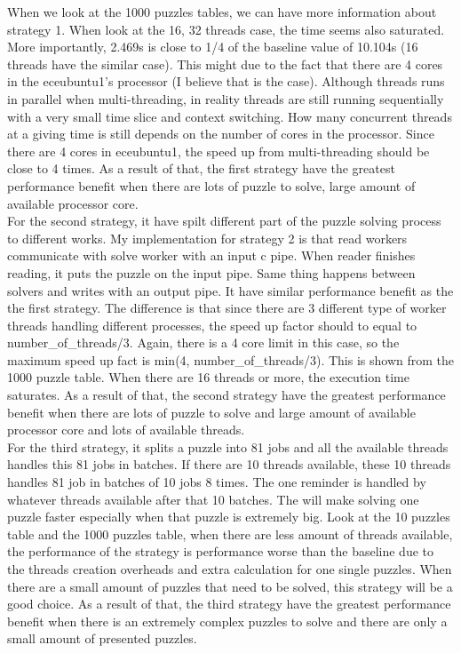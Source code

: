 \documentclass[12pt]{article}
\begin{document}
When we look at the 1000 puzzles tables, we can have more information about strategy 1. When look at the 16, 32 threads case, the time seems also saturated. More importantly, 2.469s is close to 1/4 of the baseline value of 10.104s (16 threads have the similar case). This might due to the fact that there are 4 cores in the eceubuntu1's processor (I believe that is the case). Although threads runs in parallel when multi-threading, in reality threads are still running sequentially with a very small time slice and context switching. How many concurrent threads at a giving time is still depends on the number of cores in the processor. Since there are 4 cores in eceubuntu1, the speed up from multi-threading should be close to 4 times. As a result of that, the first strategy have the greatest performance benefit when there are lots of puzzle to solve, large amount of available processor core. \\

For the second strategy, it have spilt different part of the puzzle solving process to different works. My implementation for strategy 2 is that read workers communicate with solve worker with an input c pipe. When reader finishes reading, it puts the puzzle on the input pipe. Same thing happens between solvers and writes with an output pipe. It have similar performance benefit as the the first strategy. The difference is that since there are 3 different type of worker threads handling different processes, the speed up factor should to equal to number\_of\_threads/3. Again, there is a 4 core limit in this case, so the maximum speed up fact is min(4, number\_of\_threads/3). This is shown from the 1000 puzzle table. When there are 16 threads or more, the execution time saturates.  As a result of that, the second strategy have the greatest performance benefit when there are lots of puzzle to solve and large amount of available processor core and lots of available threads. \\

For the third strategy, it splits a puzzle into 81 jobs and all the available threads handles this 81 jobs in batches. If there are 10 threads available, these 10 threads handles 81 job in batches of 10 jobs 8 times. The one reminder is handled by whatever threads available after that 10 batches. The will make solving one puzzle faster especially when that puzzle is extremely big. Look at the 10 puzzles table and the 1000 puzzles table, when there are less amount of threads available, the performance of the strategy is performance worse than the baseline due to the threads creation overheads and extra calculation for one single puzzles. When there are a small amount of puzzles that need to be solved, this strategy will be a good choice.  As a result of that, the third strategy have the greatest performance benefit when there is an extremely complex puzzles to solve and there are only a small amount of presented puzzles.
\end{document}
